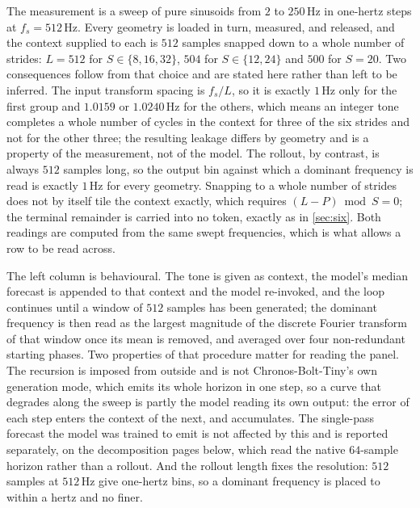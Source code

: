 The measurement is a sweep of pure sinusoids from $2$ to $250$\,Hz in one-hertz steps at $f_s=512$\,Hz. Every geometry is loaded in turn, measured, and released, and the context supplied to each is $512$ samples snapped down to a whole number of strides: $L=512$ for $S\in\{8,16,32\}$, $504$ for $S\in\{12,24\}$ and $500$ for $S=20$. Two consequences follow from that choice and are stated here rather than left to be inferred. The input transform spacing is $f_s/L$, so it is exactly $1$\,Hz only for the first group and $1.0159$ or $1.0240$\,Hz for the others, which means an integer tone completes a whole number of cycles in the context for three of the six strides and not for the other three; the resulting leakage differs by geometry and is a property of the measurement, not of the model. The rollout, by contrast, is always $512$ samples long, so the output bin against which a dominant frequency is read is exactly $1$\,Hz for every geometry. Snapping to a whole number of strides does not by itself tile the context exactly, which requires $(L-P)\bmod S=0$; the terminal remainder is carried into no token, exactly as in \autoref{sec:six}. Both readings are computed from the same swept frequencies, which is what allows a row to be read across.

The left column is behavioural. The tone is given as context, the model's median forecast is appended to that context and the model re-invoked, and the loop continues until a window of $512$ samples has been generated; the dominant frequency is then read as the largest magnitude of the discrete Fourier transform of that window once its mean is removed, and averaged over four non-redundant starting phases. Two properties of that procedure matter for reading the panel. The recursion is imposed from outside and is not Chronos-Bolt-Tiny's own generation mode, which emits its whole horizon in one step, so a curve that degrades along the sweep is partly the model reading its own output: the error of each step enters the context of the next, and accumulates. The single-pass forecast the model was trained to emit is not affected by this and is reported separately, on the decomposition pages below, which read the native $64$-sample horizon rather than a rollout. And the rollout length fixes the resolution: $512$ samples at $512$\,Hz give one-hertz bins, so a dominant frequency is placed to within a hertz and no finer.

